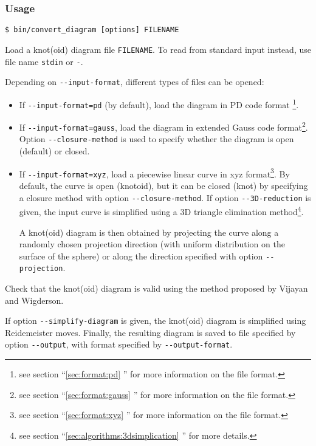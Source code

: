 \subsubsection{Usage}
\begin{lstlisting}
$ bin/convert_diagram [options] FILENAME
\end{lstlisting}


Load a knot(oid) diagram file \lstinline{FILENAME}. To read from standard input instead, use file name \lstinline{stdin} or \lstinline{-}.

Depending on \lstinline{--input-format}, different types of files can be opened:
\begin{itemize}
\item If  \lstinline{--input-format=pd} (by default), load the diagram in PD code format \footnote{see section ``\ref{sec:format:pd} ''  for more information on the file format.}.
\item If  \lstinline{--input-format=gauss}, load the diagram in extended Gauss code format\footnote{see section ``\ref{sec:format:gauss} ''  for more information on the file format.}. Option \lstinline{--closure-method} is used to specify whether the diagram is open (default) or closed.
\item If  \lstinline{--input-format=xyz}, load a piecewise linear curve in xyz format\footnote{see section ``\ref{sec:format:xyz} '' for more information on the file format.}. 
  By default, the curve is open (knotoid), but it can be closed (knot) by specifying a closure method with option \lstinline{--closure-method}.
  If option \lstinline{--3D-reduction} is given, the input curve is simplified using a 3D triangle elimination method\footnote{see section  ``\ref{sec:algorithms:3dsimplication} '' for more details.}.
  
  A knot(oid) diagram is then obtained by projecting the curve along a randomly chosen projection direction (with uniform distribution on
  the surface of the sphere) or along the direction specified with  option \lstinline{--projection}.  
\end{itemize}
Check that the knot(oid) diagram is valid using the method proposed by Vijayan and Wigderson\cite{Vijayan1982}.


If option \lstinline{--simplify-diagram} is given, the knot(oid) diagram is simplified using Reidemeister moves.
Finally, the resulting diagram is saved to file specified by option \lstinline{--output}, with format specified by \lstinline{--output-format}.

